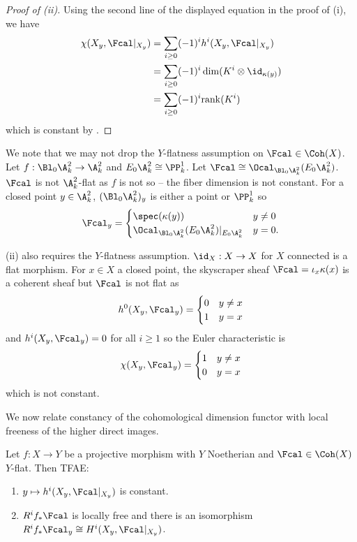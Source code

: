 \begin{proof}[Proof of (ii)]
    Using the second line of the displayed equation in the proof of (i), we have 
    \begin{align*}
        \chi(X_{y},\Fcal|_{X_{y}})&=\sum_{i\geq0}(-1)^{i}h^{i}(X_{y},\Fcal|_{X_{y}})\\ 
        &=\sum_{i\geq0}(-1)^{i}\dim(K^{i}\otimes\id_{\kappa(y)})\\
        &=\sum_{i\geq0}(-1)^{i}\mathrm{rank}(K^{i})
    \end{align*}
    which is constant by . 
\end{proof}
\begin{remark}
    We note that we may not drop the $Y$-flatness assumption on $\Fcal\in\Coh(X)$. Let $f:\Bl_{0}\A^{2}_{k}\to\A^{2}_{k}$ and $E_{0}\A^{2}_{k}\cong\PP^{1}_{k}$. Let $\Fcal\cong\Ocal_{\Bl_{0}\A^{2}_{k}}(E_{0}\A^{2}_{k})$. $\Fcal$ is not $\A^{2}_{k}$-flat as $f$ is not so -- the fiber dimension is not constant. For a closed point $y\in\A^{2}_{k}$, $(\Bl_{0}\A^{2}_{k})_{y}$ is either a point or $\PP^{1}_{k}$ so 
    $$\Fcal_{y}=\begin{cases}
        \spec(\kappa(y)) & y\neq0 \\
        \Ocal_{\Bl_{0}\A^{2}_{k}}(E_{0}\A^{2}_{k})|_{E_{0}\A^{2}_{k}} & y=0.
    \end{cases}$$

     (ii) also requires the $Y$-flatness assumption. $\id_{X}:X\to X$ for $X$ connected is a flat morphism. For $x\in X$ a closed point, the skyscraper sheaf $\Fcal=\iota_{x}\kappa(x)$ is a coherent sheaf but $\Fcal$ is not flat as
    $$h^{0}(X_{y},\Fcal_{y})=\begin{cases}
        0 & y\neq x \\ 1 & y=x
    \end{cases}$$
    and $h^{i}(X_{y},\Fcal_{y})=0$ for all $i\geq 1$ so the Euler characteristic is
    $$\chi(X_{y},\Fcal_{y})=\begin{cases}
        1 & y\neq x \\ 0 & y=x
    \end{cases}$$
    which is not constant. 
\end{remark}
We now relate constancy of the cohomological dimension functor with local freeness of the higher direct images. 
\begin{proposition}\label{prop: constant cohomology dimension iff higher direct images are locally free}
    Let $f:X\to Y$ be a projective morphism with $Y$ Noetherian and $\Fcal\in\Coh(X)$ $Y$-flat. Then TFAE: 
    \begin{enumerate}[label=(\alph*)]
        \item  $y\mapsto h^{i}(X_{y},\Fcal|_{X_{y}})$ is constant. 
        \item $R^{i}f_{*}\Fcal$ is locally free and there is an isomorphism $R^{i}f_{*}\Fcal_{y}\cong H^{i}(X_{y},\Fcal|_{X_{y}})$. 
    \end{enumerate}
\end{proposition}
